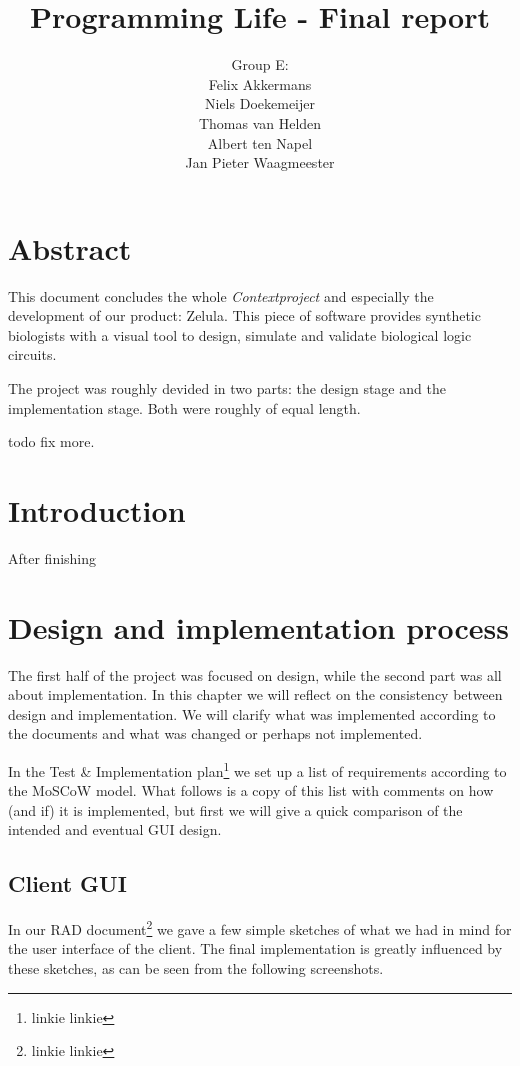 \documentclass[a4paper]{article}
\title{Programming Life - Final report}
\author{Group E:\\
Felix Akkermans \\
Niels Doekemeijer \\
Thomas van Helden \\
Albert ten Napel \\
Jan Pieter Waagmeester}
\begin{document}
\maketitle

\vfill

\small{\tableofcontents}
\pagebreak

\section*{Abstract}
This document concludes the whole \textit{Contextproject} and especially the development of our product: Zelula. This piece of software provides synthetic biologists with a visual tool to design, simulate and validate biological logic circuits.

The project was roughly devided in two parts: the design stage and the implementation stage. Both were roughly of equal length.

todo fix more.

\section{Introduction}
After finishing 


\section{Design and implementation process}
The first half of the project was focused on design, while the second part was all about implementation. In this chapter we will reflect on the consistency between design and implementation. We will clarify what was implemented according to the documents and what was changed or perhaps not implemented.

In the Test \& Implementation plan\footnote{linkie linkie} we set up a list of requirements according to the MoSCoW model. What follows is a copy of this list with comments on how (and if) it is implemented, but first we will give a quick comparison of the intended and eventual GUI design.

\subsection{Client GUI}
In our RAD document\footnote{linkie linkie} we gave a few simple sketches of what we had in mind for the user interface of the client. The final implementation is greatly influenced by these sketches, as can be seen from the following screenshots.\\
\end{document}
